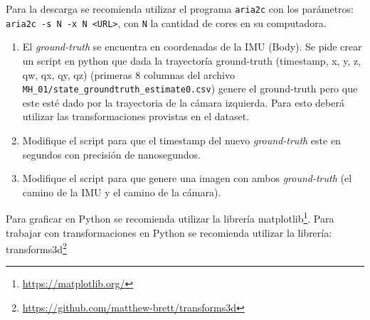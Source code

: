 \documentclass[tp]{lcc}
\begin{document}
\nota Para la descarga se recomienda utilizar el programa \lstinline{aria2c} con los parámetros: \lstinline{aria2c -s N -x N <URL>}, con \lstinline{N} la cantidad de cores en su computadora.

\begin{enumerate}
    \item El \emph{ground-truth} se encuentra en coordenadas de la IMU (Body). Se pide crear un script en python que dada la trayectoría ground-truth (timestamp, x, y, z, qw, qx, qy, qz) (primeras 8 columnas del archivo \lstinline{MH_01/state_groundtruth_estimate0.csv}) genere el ground-truth pero que este esté dado por la trayectoria de la cámara izquierda. Para esto deberá utilizar las transformaciones provistas en el dataset. 
    
    \item Modifique el script para que el timestamp del nuevo \emph{ground-truth} este en segundos con precisión de nanosegundos.
    
    \item Modifique el script para que genere una imagen con ambos \emph{ground-truth} (el camino de la IMU y el camino de la cámara).
\end{enumerate}
\nota Para graficar en Python se recomienda utilizar la librería matplotlib\footnote{\url{https://matplotlib.org/}}. Para trabajar con transformaciones en Python se recomienda utilizar la librería: transforms3d\footnote{\url{https://github.com/matthew-brett/transforms3d}}
\end{document}
